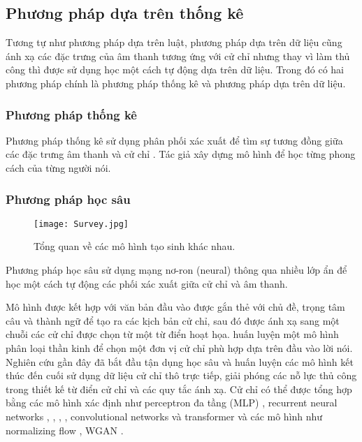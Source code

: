 \subsection{Phương pháp dựa trên thống kê}

Tương tự như phương pháp dựa trên luật, phương pháp dựa trên dữ liệu cũng ánh xạ các đặc trưng của âm thanh tương ứng với cử chỉ nhưng thay vì làm thủ công thì được sử dụng học một cách tự động dựa trên dữ liệu.
Trong đó có hai phương pháp chính là phương pháp thống kê và phương pháp dựa trên dữ liệu.


\subsubsection{Phương pháp thống kê}

Phương pháp thống kê sử dụng phân phối xác xuất để tìm sự tương đồng giữa các đặc trưng âm thanh và cử chỉ \cite{levine2010gesture}. Tác giả \cite{neff2008gesture} xây dựng mô hình để học từng phong cách của từng người nói.

\subsubsection{Phương pháp học sâu}

\begin{figure}
	\centering
	\texttt{[image: Survey.jpg]}
	\caption{Tổng quan về các mô hình tạo sinh khác nhau.}
	\label{fig:generative-models}
\end{figure}

Phương pháp học sâu sử dụng mạng nơ-ron (neural) thông qua nhiều lớp ẩn để học một cách tự động các phối xác xuất giữa cử chỉ và âm thanh.

Mô hình được kết hợp với văn bản đầu vào được gắn thẻ với chủ đề, trọng tâm câu và thành ngữ để tạo ra các kịch bản cử chỉ, sau đó được ánh xạ sang một chuỗi các cử chỉ được chọn từ một từ điển hoạt họa. \cite{chiu2015predicting} huấn luyện một mô hình phân loại thần kinh để chọn một đơn vị cử chỉ phù hợp dựa trên đầu vào lời nói. Nghiên cứu gần đây đã bắt đầu tận dụng học sâu và huấn luyện các mô hình kết thúc đến cuối sử dụng dữ liệu cử chỉ thô trực tiếp, giải phóng các nỗ lực thủ công trong thiết kế từ điển cử chỉ và các quy tắc ánh xạ. Cử chỉ có thể được tổng hợp bằng các mô hình xác định như perceptron đa tầng (MLP) \cite{kucherenko2020gesticulator}, recurrent neural networks \cite{bhattacharya2021speech2affectivegestures}, \cite{liu2022learning}, \cite{hasegawa2018evaluation}, \cite{yoon2020speech}, convolutional networks \cite{habibie2021learning} và transformer \cite{bhattacharya2021text2gestures} và các mô hình như normalizing flow \cite{alexanderson2020style}, WGAN \cite{wu2021probabilistic}.

